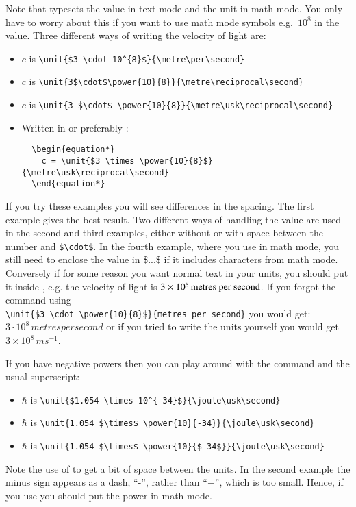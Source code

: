 Note that  typesets the value in text mode and the
unit in math mode. You only have to worry about this if you want to
use math mode symbols e.g.\ $10^{8}$ in the value. Three different ways
of writing the velocity of light are:
\begin{itemize}\setlength{\itemsep}{0pt}\setlength{\parskip}{0pt}
\item $c$ is \verb+\unit{$3 \cdot 10^{8}$}{\metre\per\second}+
\item $c$ is
  \verb+\unit{3$\cdot$\power{10}{8}}{\metre\reciprocal\second}+
\item $c$ is \verb+\unit{3 $\cdot$ \power{10}{8}}{\metre\usk\reciprocal\second}+
\item Written in  or preferably :
\begin{verbatim}
  \begin{equation*}
    c = \unit{$3 \times \power{10}{8}$}{\metre\usk\reciprocal\second}
  \end{equation*}
\end{verbatim}
\end{itemize}
If you try these examples you will see differences in the spacing.
The first example gives the best result.
Two different ways of handling the value
are used in the second and third examples, either without or with space between
the number and \verb+$\cdot$+. In the fourth example, where you use
 in math mode, you still need to enclose the value in
\$...\$ if it includes characters from math mode.  Conversely if for
some reason you want normal text in your units, you should put it
inside , e.g. the velocity of light is
$\SI{3E8}{\text{metres per second}}$. If you forgot the
 command using\\
\verb+\unit{$3 \cdot \power{10}{8}$}{metres per second}+ you would
get:
$3 \cdot 10^{8}\,metres per second$ or if you tried to write the units
yourself you would get $3 \times 10^8\,m s^{-1}$.

If you have negative powers then you can play around with
the  command and the usual superscript:
\begin{itemize}
\item $\hbar$ is \verb+\unit{$1.054 \times 10^{-34}$}{\joule\usk\second}+
\item $\hbar$ is \verb+\unit{1.054 $\times$ \power{10}{-34}}{\joule\usk\second}+
\item $\hbar$ is \verb+\unit{1.054 $\times$ \power{10}{$-34$}}{\joule\usk\second}+
\end{itemize}
Note the use of  to get a bit of space between the
units. In the second example the minus sign appears as a dash,
\enquote{-}, rather than \enquote{$-$}, which is too small. Hence, if you
use  you should put the power in math mode.

